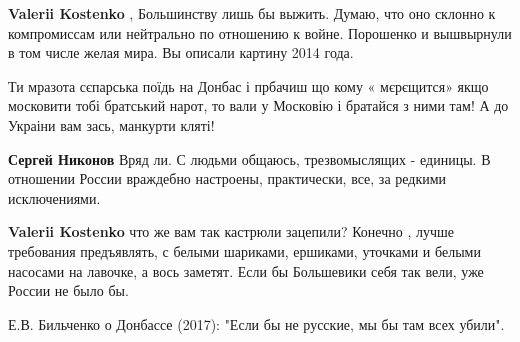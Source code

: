 \begin{itemize}
\begin{itemize} %
 
\textbf{Valerii Kostenko} , Большинству лишь бы выжить. Думаю, что оно склонно к компромиссам или нейтрально по отношению к войне. Порошенко и вышвырнули в том числе желая мира. Вы описали картину 2014 года.

 
Ти мразота сєпарська поїдь на Донбас і прбачиш що кому « мєрєщится» якщо московити тобі братський нарот, то вали у Московію і братайся з ними там! А до Украіни вам зась, манкурти кляті!

 
\textbf{Сергей Никонов}
Вряд ли. С людьми общаюсь, трезвомыслящих - единицы. В отношении России враждебно настроены, практически, все, за редкими исключениями.

 
\textbf{Valerii Kostenko} что же вам так кастрюли зацепили? Конечно , лучше требования предъявлять, с белыми шариками, ершиками, уточками и белыми насосами на лавочке, а вось заметят. Если бы Большевики себя так вели, уже России не было бы.
\end{itemize} %

 

Е.В. Бильченко о Донбассе (2017): "Если бы не русские, мы бы там всех убили".


\end{itemize}
